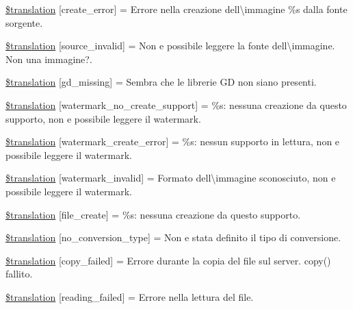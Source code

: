 \begin{DoxyCompactItemize}
\item 
\hyperlink{class_8upload_8it___i_t_8php_a53013ce9255c4e1849098ddd9fdb2b3f}{\$translation} \mbox{[}\textquotesingle{}create\+\_\+error\textquotesingle{}\mbox{]} = \textquotesingle{}Errore nella creazione dell\textbackslash{}\textquotesingle{}immagine \%s dalla fonte sorgente.\textquotesingle{}
\item 
\hyperlink{class_8upload_8it___i_t_8php_a6ab0a660b457eaf2d3434b225449fdd6}{\$translation} \mbox{[}\textquotesingle{}source\+\_\+invalid\textquotesingle{}\mbox{]} = \textquotesingle{}Non e possibile leggere la fonte dell\textbackslash{}\textquotesingle{}immagine. Non una immagine?.\textquotesingle{}
\item 
\hyperlink{class_8upload_8it___i_t_8php_a7f3dfcc0db4bbc0f2e7210c439798e56}{\$translation} \mbox{[}\textquotesingle{}gd\+\_\+missing\textquotesingle{}\mbox{]} = \textquotesingle{}Sembra che le librerie G\+D non siano presenti.\textquotesingle{}
\item 
\hyperlink{class_8upload_8it___i_t_8php_a82d5853430ab72dc1f9799ec36144cc6}{\$translation} \mbox{[}\textquotesingle{}watermark\+\_\+no\+\_\+create\+\_\+support\textquotesingle{}\mbox{]} = \textquotesingle{}\%s\+: nessuna creazione da questo supporto, non e possibile leggere il watermark.\textquotesingle{}
\item 
\hyperlink{class_8upload_8it___i_t_8php_aabca0b65dadbc6184415c16375f284ca}{\$translation} \mbox{[}\textquotesingle{}watermark\+\_\+create\+\_\+error\textquotesingle{}\mbox{]} = \textquotesingle{}\%s\+: nessun supporto in lettura, non e possibile leggere il watermark.\textquotesingle{}
\item 
\hyperlink{class_8upload_8it___i_t_8php_ac336e7a5701e47ba4a05e9e498a3cc44}{\$translation} \mbox{[}\textquotesingle{}watermark\+\_\+invalid\textquotesingle{}\mbox{]} = \textquotesingle{}Formato dell\textbackslash{}\textquotesingle{}immagine sconosciuto, non e possibile leggere il watermark.\textquotesingle{}
\item 
\hyperlink{class_8upload_8it___i_t_8php_a1ecb4673e4fb69e06b3f20b65cecf30a}{\$translation} \mbox{[}\textquotesingle{}file\+\_\+create\textquotesingle{}\mbox{]} = \textquotesingle{}\%s\+: nessuna creazione da questo supporto.\textquotesingle{}
\item 
\hyperlink{class_8upload_8it___i_t_8php_a4712d7ec28e9a7f17eb3338af2358363}{\$translation} \mbox{[}\textquotesingle{}no\+\_\+conversion\+\_\+type\textquotesingle{}\mbox{]} = \textquotesingle{}Non e stata definito il tipo di conversione.\textquotesingle{}
\item 
\hyperlink{class_8upload_8it___i_t_8php_a783c9358bcf54a054545b50098bc679b}{\$translation} \mbox{[}\textquotesingle{}copy\+\_\+failed\textquotesingle{}\mbox{]} = \textquotesingle{}Errore durante la copia del file sul server. copy() fallito.\textquotesingle{}
\item 
\hyperlink{class_8upload_8it___i_t_8php_a01bea14c9fd5f353f62db44beabfcd42}{\$translation} \mbox{[}\textquotesingle{}reading\+\_\+failed\textquotesingle{}\mbox{]} = \textquotesingle{}Errore nella lettura del file.\textquotesingle{}
\end{DoxyCompactItemize}


